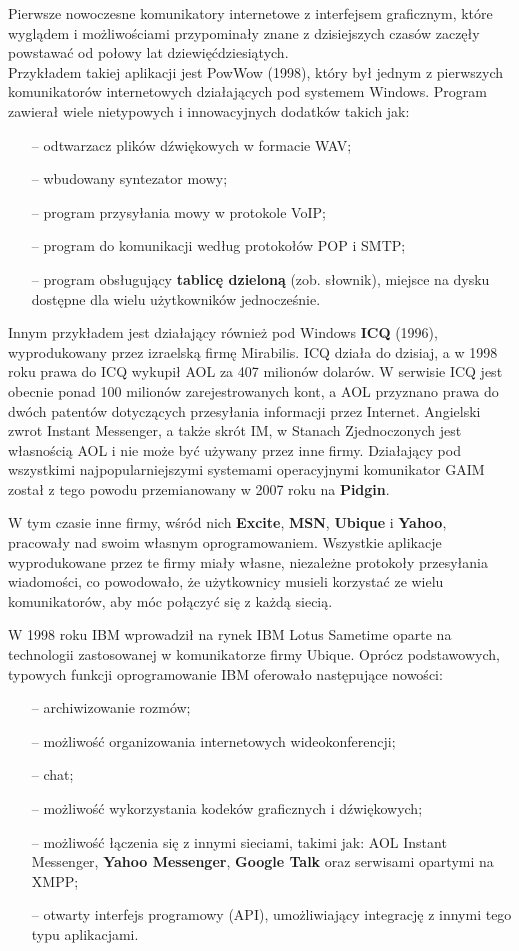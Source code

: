 \documentclass[a4paper,12pt]{article}
\begin{document}
\par Pierwsze nowoczesne komunikatory internetowe z interfejsem graficznym, które wyglądem i możliwościami przypominały znane z dzisiejszych czasów zaczęły powstawać od połowy lat dziewięćdziesiątych.\\
Przykładem takiej aplikacji jest PowWow (1998), który był jednym z pierwszych komunikatorów internetowych działających pod systemem Windows. Program zawierał wiele nietypowych i innowacyjnych dodatków takich jak:
\begin{itemize}
    \item[--] odtwarzacz plików dźwiękowych w formacie WAV;
    \item[--] wbudowany syntezator mowy;
    \item[--] program przysyłania mowy w protokole VoIP;
    \item[--] program do komunikacji według protokołów POP i SMTP;
    \item[--] program obsługujący \textbf{tablicę dzieloną} (zob. słownik), miejsce na dysku dostępne dla wielu użytkowników jednocześnie.
\end{itemize}
Innym przykładem jest działający również pod Windows \textbf{ICQ} (1996), wyprodukowany przez izraelską firmę Mirabilis. ICQ działa do dzisiaj, a w 1998 roku prawa do ICQ wykupił AOL za 407 milionów dolarów. W serwisie ICQ jest obecnie ponad 100 milionów zarejestrowanych kont, a AOL przyznano prawa do dwóch patentów dotyczących przesyłania informacji przez Internet. Angielski zwrot Instant Messenger, a także skrót IM, w Stanach Zjednoczonych jest własnością AOL i nie może być używany przez inne firmy. Działający pod wszystkimi najpopularniejszymi systemami operacyjnymi komunikator GAIM został z tego powodu przemianowany w 2007 roku na \textbf{Pidgin}.

W tym czasie inne firmy, wśród nich \textbf{Excite}, \textbf{MSN}, \textbf{Ubique} i \textbf{Yahoo}, pracowały nad swoim własnym oprogramowaniem.
Wszystkie aplikacje wyprodukowane przez te firmy miały własne, niezależne protokoły przesyłania wiadomości, co powodowało, że użytkownicy musieli korzystać ze wielu komunikatorów, aby móc połączyć się z każdą siecią.

\par W 1998 roku IBM wprowadził na rynek IBM Lotus Sametime oparte na technologii zastosowanej w komunikatorze firmy Ubique. Oprócz podstawowych, typowych funkcji oprogramowanie IBM oferowało następujące nowości:
\begin{itemize}
    \item[--] archiwizowanie rozmów;
    \item[--] możliwość organizowania internetowych wideokonferencji;
    \item[--] chat;
    \item[--] możliwość wykorzystania kodeków graficznych i dźwiękowych;
    \item[--] możliwość łączenia się z innymi sieciami, takimi jak: AOL Instant Messenger, \textbf{Yahoo Messenger}, \textbf{Google Talk} oraz serwisami opartymi na XMPP;
    \item[--] otwarty interfejs programowy (API), umożliwiający integrację z innymi tego typu aplikacjami.
\end{itemize}
\end{document}
